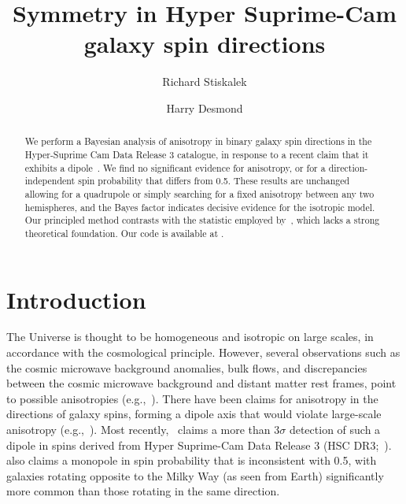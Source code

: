 \documentclass{aastex631}
\newcommand{\github}[1]{\href{#1}{\faGithubSquare}}
\newcommand{\githublink}{\github{https://github.com/harrydesmond/GalaxySpinAnisotropy}}
\begin{document}
\title{Symmetry in Hyper Suprime-Cam galaxy spin directions}

\author[0000-0002-0986-314X]{Richard Stiskalek}

\author[0000-0003-0685-9791]{Harry Desmond}


\begin{abstract}

We perform a Bayesian analysis of anisotropy in binary galaxy spin directions in the Hyper-Suprime Cam Data Release 3 catalogue, in response to a recent claim that it exhibits a dipole~\citep{Shamir_2024}. We find no significant evidence for anisotropy, or for a direction-independent spin probability that differs from 0.5. These results are unchanged allowing for a quadrupole or simply searching for a fixed anisotropy between any two hemispheres, and the Bayes factor indicates decisive evidence for the isotropic model. Our principled method contrasts with the statistic employed by~\citet{Shamir_2024}, which lacks a strong theoretical foundation. Our code is available at \githublink.

\end{abstract}



\section{Introduction}\label{sec:introduction}
    
The Universe is thought to be homogeneous and isotropic on large scales, in accordance with the cosmological principle. However, several observations such as the cosmic microwave background anomalies, bulk flows, and discrepancies between the cosmic microwave background and distant matter rest frames, point to possible anisotropies (e.g.,~\citealt{CF4,EB_1}). There have been claims for anisotropy in the directions of galaxy spins, forming a dipole axis that would violate large-scale anisotropy (e.g.,~\citealt{Longo, McAdam_Shamir_2023_GAN}). Most recently,~\cite{Shamir_2024} claims a more than $3\sigma$ detection of such a dipole in spins derived from Hyper Suprime-Cam Data Release 3 (HSC DR3;~\citealt{HSC_DR3}).~\citet{Shamir_2024} also claims a monopole in spin probability that is inconsistent with 0.5, with galaxies rotating opposite to the Milky Way (as seen from Earth) significantly more common than those rotating in the same direction.
\end{document}
